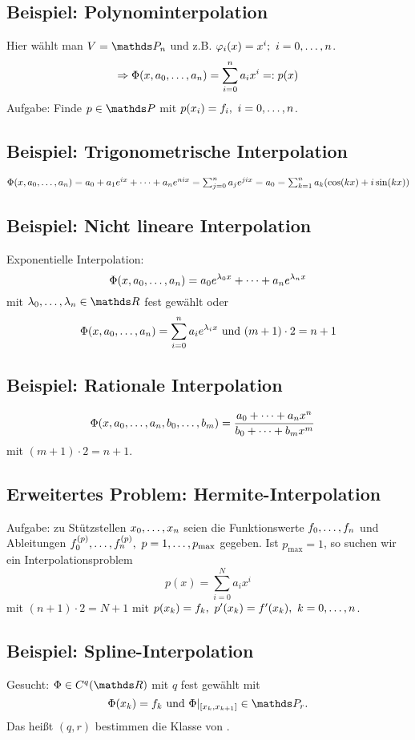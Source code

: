 \subsection{Beispiel: Polynominterpolation}
\label{sub:polynom}
Hier wählt man $V=\Pw_n$ und z.B. $\varphi_i(x)=x^i;~i=0, \dots ,n$.
\[
\Rightarrow \Phi(x,a_0, \dots ,a_n)=\sum_{i=0}^{n}a_ix^i=:p(x)
\]
Aufgabe: Finde $p\in \Pw$ mit $p(x_i)=f_i,~i=0, \dots ,n$.

\subsection{Beispiel: Trigonometrische Interpolation}
\label{sub:trigonometrische}
$\Phi(x,a_0, \dots ,a_n)=a_0+a_1e^{ix}+ \dots +a_ne^{nix}=\sum_{j=0}^{n}a_je^{jix}=a_0=\sum_{k=1}^{n}a_k(\cos(kx)+i\sin(kx))$

\subsection{Beispiel: Nicht lineare Interpolation}
\label{sub:nicht_linear}
Exponentielle Interpolation:
\[
\Phi(x,a_0, \dots ,a_n)=a_0e^{\lambda_0x}+ \dots +a_ne^{\lambda_nx}
\]
mit $\lambda_0\dt{,}\lambda_n\in \R$ fest gewählt oder
\[
\Phi(x,a_0, \dots ,a_n)= \sum_{i=0}^{n}a_ie^{\lambda_ix}\text{ und }(m+1)\cdot 2=n+1
\]

\subsection{Beispiel: Rationale Interpolation}
\label{sub:rational}
\begin{equation*}
\begin{aligned}
\Phi(x,a_0, \dots ,a_n,b_0, \dots ,b_m) &= \frac{a_0+ \dots +a_nx^n}{b_0+ \dots +b_mx^m}
\end{aligned}
\end{equation*}
mit $(m+1)\cdot 2=n+1$.

\subsection{Erweitertes Problem: Hermite-Interpolation}
\label{sub:hermite}
Aufgabe: zu Stützstellen $x_0, \dots ,x_n$ seien die Funktionswerte $f_0, \dots ,f_n$ und Ableitungen $f_0^{(p)}, \dots ,f_n^{(p)},~p=1, \dots ,p_{\max}$ gegeben.
Ist $p_{\max}=1$, so suchen wir ein Interpolationsproblem
\[
p(x)=\sum_{i=0}^N a_ix^i
\]
mit $(n+1)\cdot 2=N+1$ mit $p(x_k)=f_k,~p'(x_k)=f'(x_k),~k=0, \dots ,n$.

\subsection{Beispiel: Spline-Interpolation}
\label{sub:spline}
Gesucht: $\Phi\in C^q(\R)$ mit $q$ fest gewählt mit 
\[
\Phi(x_k)=f_k \text{ und } \Phi|_{[x_k,x_{k+1}]}\in \Pw_r.
\] 
Das heißt $(q,r)$ bestimmen die Klasse von .


